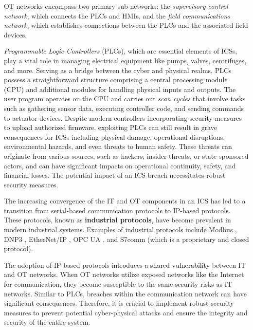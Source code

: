 OT networks encompass two primary sub-networks: the \textit{supervisory control network}, which connects the PLCs and HMIs, and the \textit{field communications network}, which establishes connections between the PLCs and the associated field devices.

\bigskip
\textit{Programmable Logic Controllers} (PLCs), which are essential elements of ICSs, play a vital role in managing electrical equipment like pumps, valves, centrifuges, and more. Serving as a bridge between the cyber and physical realms, PLCs possess a straightforward structure comprising a central processing module (CPU) and additional modules for handling physical inputs and outputs. The user program operates on the CPU and carries out \textit{scan cycles} that involve tasks such as gathering sensor data, executing controller code, and sending commands to actuator devices. Despite modern controllers incorporating security measures to upload authorized firmware, exploiting PLCs can still result in grave consequences for ICSs including physical damage, operational disruptions, environmental hazards, and even threats to human safety. These threats can originate from various sources, such as hackers, insider threats, or state-sponsored actors, and can have significant impacts on operational continuity, safety, and financial losses. The potential impact of an ICS breach necessitates robust security measures.

\bigskip
The increasing convergence of the IT and OT components in an ICS has led to a transition from serial-based communication protocols to IP-based protocols. These protocols, known as \textbf{industrial protocols}, have become prevalent in modern industrial systems. Examples of industrial protocols include Modbus \cite{Modbus_definition}, DNP3 \cite{dnp3}, EtherNet/IP \cite{enip_pdf2}, OPC UA \cite{opc}, and S7comm \cite{s7comm} (which is a proprietary and closed protocol).

The adoption of IP-based protocols introduces a shared vulnerability between IT and OT networks. When OT networks utilize exposed networks like the Internet for communication, they become susceptible to the same security risks as IT networks. Similar to PLCs, breaches within the communication network can have significant consequences. Therefore, it is crucial to implement robust security measures to prevent potential cyber-physical attacks and ensure the integrity and security of the entire system.

